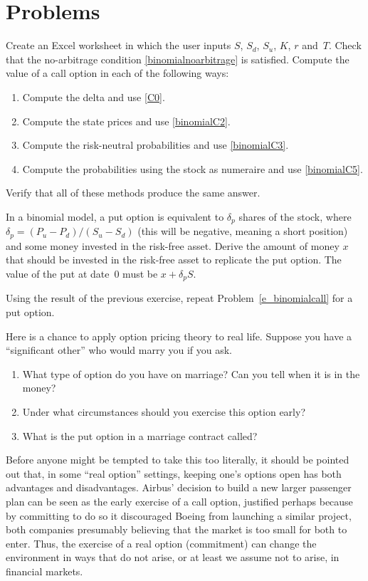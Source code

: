\section*{Problems}
\begin{prob} 
\label{e_binomialcall} 
Create an Excel worksheet in which the user inputs $S$, $S_d$, $S_u$, $K$, $r$ and~$T$.  Check that the no-arbitrage condition \eqref{binomialnoarbitrage} is satisfied.  Compute the value of a call option in each of the following ways:
\begin{enumerate}
\renewcommand{\labelenumi}{(\alph{enumi})}
\item Compute the delta and use  \eqref{C0}.
\item Compute the state prices and use  \eqref{binomialC2}.
\item Compute the risk-neutral probabilities and use  \eqref{binomialC3}.
\item Compute the probabilities using the stock as numeraire and use  \eqref{binomialC5}.
\end{enumerate}
Verify that all of these methods produce the same answer.
\end{prob}
\begin{prob} 
In a binomial model, a put option is equivalent to $\delta_p$ shares of the stock, where $\delta_p = (P_u-P_d)/(S_u-S_d)$ (this will be negative, meaning a short position) and some money invested in the risk-free asset.  Derive the amount of money $x$ that should be invested in the risk-free asset to replicate the put option.  The value of the put at date~0 must  be $x+\delta_pS$.
\end{prob}
\begin{prob}
Using the result of the previous exercise, repeat Problem~\ref{e_binomialcall} for a put option.
\end{prob}
\begin{prob} Here is a chance to apply option pricing theory to real life.  Suppose you have a ``significant other'' who would marry you if you ask.  
\begin{enumerate}
\renewcommand{\labelenumi}{(\alph{enumi})}
\item What type of option do you have on marriage?  Can you tell when it is in the money?
\item Under what circumstances should you exercise this option early?  
\item What is the put option in a marriage contract called?  
\end{enumerate}
Before anyone might be tempted to take this too literally, it should be pointed out that, in some ``real option'' settings, keeping one's options open has both advantages and disadvantages.  Airbus' decision to build a new larger passenger plan can be seen as the early exercise of a call option, justified perhaps because by committing to do so it discouraged Boeing from launching a similar project, both companies presumably believing that the market is too small for both to enter.  Thus, the exercise of a real option (commitment) can change the environment in ways that do not arise, or at least we assume not to arise, in financial markets.
\end{prob}